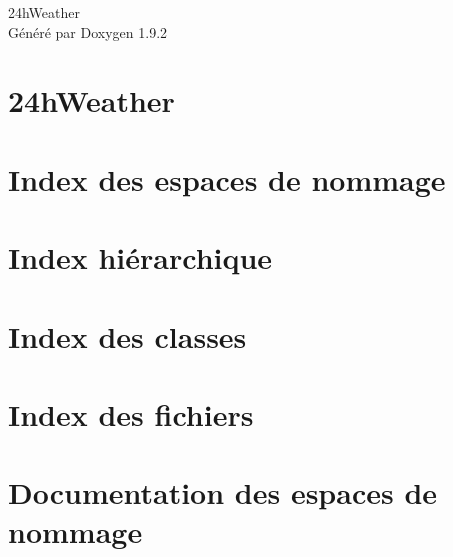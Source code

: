 \documentclass[twoside]{book}
\newcommand{\+}{\discretionary{\mbox{\scriptsize$\hookleftarrow$}}{}{}}
\newcommand{\clearemptydoublepage}{%
    \newpage{\pagestyle{empty}\cleardoublepage}%
  }
\begin{document}
  \raggedbottom
    \hypersetup{pageanchor=false,
                bookmarksnumbered=true,
                pdfencoding=unicode
               }
  \begin{titlepage}
  \vspace*{7cm}
  \begin{center}%
  {\Large 24h\+Weather}\\
  \vspace*{1cm}
  {\large Généré par Doxygen 1.9.2}\\
  \end{center}
  \end{titlepage}
  \clearemptydoublepage
  \tableofcontents
  \clearemptydoublepage
  \hypersetup{pageanchor=true}
\chapter{24h\+Weather}
\label{md__r_e_a_d_m_e}

\chapter{Index des espaces de nommage}

\chapter{Index hiérarchique}

\chapter{Index des classes}

\chapter{Index des fichiers}

\chapter{Documentation des espaces de nommage}











\end{document}
